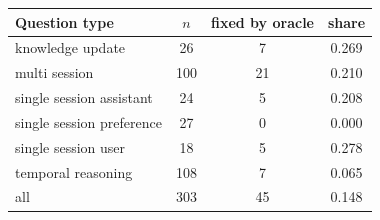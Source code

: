 \begin{tabular}{lccc}
\toprule
Question type & $n$ & fixed by oracle & share \\
\midrule
knowledge update & 26 & 7 & 0.269 \\
multi session & 100 & 21 & 0.210 \\
single session assistant & 24 & 5 & 0.208 \\
single session preference & 27 & 0 & 0.000 \\
single session user & 18 & 5 & 0.278 \\
temporal reasoning & 108 & 7 & 0.065 \\
\midrule
all & 303 & 45 & 0.148 \\
\bottomrule
\end{tabular}
